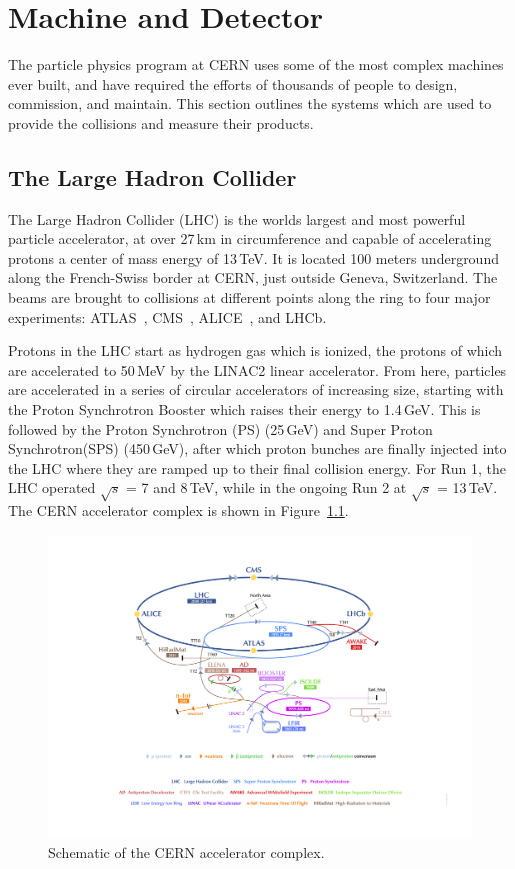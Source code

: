 
\chapter{Machine and Detector}
\label{ch:Detector}

The particle physics program at CERN uses some of the most complex machines ever built, and have required the efforts of thousands of people to design, commission, and maintain.  This section outlines the systems which are used to provide the collisions and measure their products.

\section{The Large Hadron Collider}

The Large Hadron Collider (LHC) is the worlds largest and most powerful particle accelerator, at over 27\,km in circumference and capable of accelerating protons a center of mass energy of 13\,TeV.  It is located 100 meters underground along the French-Swiss border at CERN, just outside Geneva, Switzerland.  The beams are brought to collisions at different points along the ring to four major experiments: ATLAS~\cite{ATLAS}, CMS~\cite{CMS}, ALICE~\cite{ALICE}, and LHCb.\cite{LHCb}

Protons in the LHC start as hydrogen gas which is ionized, the protons of which are accelerated to 50\,MeV by the LINAC2 linear accelerator.  From here, particles are accelerated in a series of circular accelerators of increasing size, starting with the Proton Synchrotron Booster which raises their energy to 1.4\,GeV.  This is followed by the Proton Synchrotron (PS) (25\,GeV) and Super Proton Synchrotron(SPS) (450\,GeV), after which proton bunches are finally injected into the LHC where they are ramped up to their final collision energy.  For Run 1, the LHC operated $\sqrt{s}$ = 7 and 8\,TeV, while in the ongoing Run 2 at $\sqrt{s}$ = 13\,TeV.  The CERN accelerator complex is shown in Figure~\ref{fig:AcceleratorMap}.

\begin{figure}[h!]
	\centering
	\includegraphics[width=\columnwidth]{figures/Detector/CERNAcceleratorComplex.jpg}
	\caption{Schematic of the CERN accelerator complex.\cite{DeMelis:2119882}
	}
	\label{fig:AcceleratorMap}
\end{figure}

